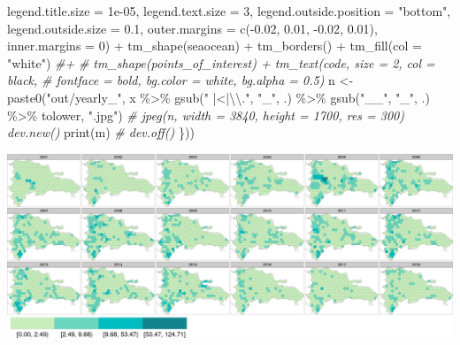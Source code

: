 \documentclass[10pt,landscape,a3paper]{article}
\newenvironment{Shaded}{\begin{snugshade}}{\end{snugshade}}
\newcommand{\AttributeTok}[1]{\textcolor[rgb]{0.77,0.63,0.00}{#1}}
\newcommand{\CommentTok}[1]{\textcolor[rgb]{0.56,0.35,0.01}{\textit{#1}}}
\newcommand{\DecValTok}[1]{\textcolor[rgb]{0.00,0.00,0.81}{#1}}
\newcommand{\FloatTok}[1]{\textcolor[rgb]{0.00,0.00,0.81}{#1}}
\newcommand{\FunctionTok}[1]{\textcolor[rgb]{0.00,0.00,0.00}{#1}}
\newcommand{\NormalTok}[1]{#1}
\newcommand{\OtherTok}[1]{\textcolor[rgb]{0.56,0.35,0.01}{#1}}
\newcommand{\SpecialCharTok}[1]{\textcolor[rgb]{0.00,0.00,0.00}{#1}}
\newcommand{\StringTok}[1]{\textcolor[rgb]{0.31,0.60,0.02}{#1}}
\begin{document}
\begin{Shaded}
\begin{Highlighting}[]
        \AttributeTok{legend.title.size =} \FloatTok{1e{-}05}\NormalTok{, }\AttributeTok{legend.text.size =} \DecValTok{3}\NormalTok{, }\AttributeTok{legend.outside.position =} \StringTok{"bottom"}\NormalTok{,}
        \AttributeTok{legend.outside.size =} \FloatTok{0.1}\NormalTok{, }\AttributeTok{outer.margins =} \FunctionTok{c}\NormalTok{(}\SpecialCharTok{{-}}\FloatTok{0.02}\NormalTok{, }\FloatTok{0.01}\NormalTok{, }\SpecialCharTok{{-}}\FloatTok{0.02}\NormalTok{, }\FloatTok{0.01}\NormalTok{), }\AttributeTok{inner.margins =} \DecValTok{0}\NormalTok{) }\SpecialCharTok{+}
        \FunctionTok{tm\_shape}\NormalTok{(seaocean) }\SpecialCharTok{+} \FunctionTok{tm\_borders}\NormalTok{() }\SpecialCharTok{+} \FunctionTok{tm\_fill}\NormalTok{(}\AttributeTok{col =} \StringTok{"white"}\NormalTok{)  }\CommentTok{\#+ }
    \CommentTok{\# tm\_shape(points\_of\_interest) + tm\_text(\textquotesingle{}code\textquotesingle{}, size = 2, col = \textquotesingle{}black\textquotesingle{},}
    \CommentTok{\# fontface = \textquotesingle{}bold\textquotesingle{}, bg.color = \textquotesingle{}white\textquotesingle{}, bg.alpha = 0.5)}
\NormalTok{    n }\OtherTok{\textless{}{-}} \FunctionTok{paste0}\NormalTok{(}\StringTok{"out/yearly\_"}\NormalTok{, x }\SpecialCharTok{\%\textgreater{}\%}
        \FunctionTok{gsub}\NormalTok{(}\StringTok{" |\textless{}|}\SpecialCharTok{\textbackslash{}\textbackslash{}}\StringTok{."}\NormalTok{, }\StringTok{"\_"}\NormalTok{, .) }\SpecialCharTok{\%\textgreater{}\%}
        \FunctionTok{gsub}\NormalTok{(}\StringTok{"\_\_"}\NormalTok{, }\StringTok{"\_"}\NormalTok{, .) }\SpecialCharTok{\%\textgreater{}\%}
\NormalTok{        tolower, }\StringTok{".jpg"}\NormalTok{)}
    \CommentTok{\# jpeg(n, width = 3840, height = 1700, res = 300) dev.new()}
    \FunctionTok{print}\NormalTok{(m)}
    \CommentTok{\# dev.off()}
\NormalTok{\}))}
\end{Highlighting}
\end{Shaded}

\begin{center}\includegraphics{img/modelling/aa-yearly-forest-loss-maps-1} \end{center}
\end{document}
